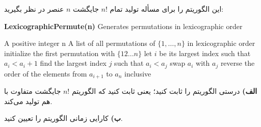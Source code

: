 \documentclass{article}
\begin{document}
این الگوریتم را برای مسأله تولید تمام
$n!$
جایگشت‌
$n$
عنصر در نظر بگیرید:

\begin{latin}
    \begin{algorithm}[H]
        \caption*{\textbf{LexicographicPermute(n)} Generates permutations in lexicographic order} 
        \begin{algorithmic}
            \Require A positive integer n
            \Ensure A list of all permutations of $\{1, \ldots , n\}$ in lexicographic order
            \State initialize the first permutation with  $\{12 . . . n\}$
                \State let $i$ be its largest index such that  $a_i<a_i+1$ 
                \State find the largest index $j$ such that $a_i<a_j$ 
                \State swap $a_i$ with $a_j$ 
                \State reverse the order of the elements from $a_{i+1}$ to $a_n$ inclusive
            \EndWhile
        \end{algorithmic}
    \end{algorithm}
\end{latin}

    \textbf{الف)} درستی الگوریتم را ثابت کنید؛ یعنی ثابت کنید که الگوریتم 
    $n!$
    جایگشت متفاوت با هم تولید می‌کند.
    
    \textbf{ب)}  کارایی زمانی الگوریتم را تعیین کنید.
\end{document}
